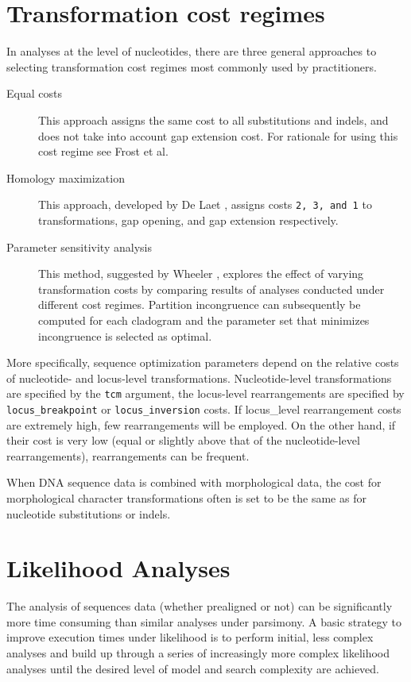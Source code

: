 \section{Transformation cost regimes}
In analyses at the level of nucleotides, there are three general approaches to selecting transformation cost regimes most commonly used by \poy practitioners.
\begin{description}
\item[Equal costs] This approach assigns the same cost to all substitutions and indels, and does not take into account gap extension cost. For rationale for using this cost regime see Frost et al. \cite{frost2001} %
\item[Homology maximization] This approach, developed by De Laet \cite{delaet2005}, assigns costs \texttt{2, 3, and 1} to transformations, gap opening, and gap extension respectively. %
\item[Parameter sensitivity analysis] This method, suggested by Wheeler \cite{wheeler1995}, explores the effect of varying transformation costs by comparing results of analyses conducted under different cost regimes. Partition incongruence can subsequently be computed  for each cladogram and the parameter set that minimizes incongruence is selected as optimal. %
\end{description}
More specifically, sequence optimization parameters depend on the relative costs of nucleotide- and locus-level transformations. Nucleotide-level transformations are specified by the \texttt{tcm} argument, the locus-level rearrangements are specified by \texttt{locus\_breakpoint} or \texttt{locus\_inversion} costs. If locus\_level rearrangement costs are extremely high, few rearrangements will be employed. On the other hand, if their cost is very low (equal or slightly above that of the nucleotide-level rearrangements), rearrangements can be frequent.

When DNA sequence data is combined with morphological data, the cost for morphological character transformations often is  set to be the same as for 
nucleotide substitutions or indels.

\section{Likelihood Analyses}
The analysis of sequences data (whether prealigned or not) can be significantly more time consuming than 
similar analyses under parsimony.  A basic strategy to improve execution times under likelihood
is to perform initial, less complex analyses and build up through a series of increasingly more complex likelihood analyses
until the desired level of model and search complexity are achieved.  

